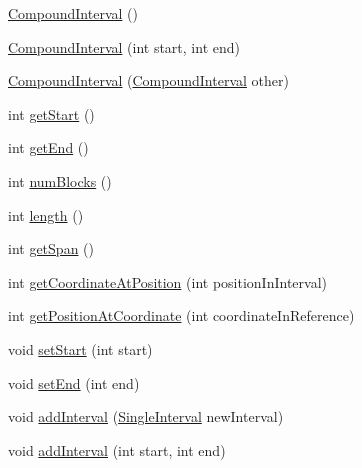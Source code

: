 \begin{DoxyCompactItemize}
\item 
\hyperlink{classumms_1_1core_1_1annotation_1_1_compound_interval_a11643c83ca967494810bdcb0bd7886a7}{Compound\+Interval} ()
\item 
\hyperlink{classumms_1_1core_1_1annotation_1_1_compound_interval_af3c436298d476702cd4f2b4f1883fe3b}{Compound\+Interval} (int start, int end)
\item 
\hyperlink{classumms_1_1core_1_1annotation_1_1_compound_interval_ad2b8402757cce5a10b4169b9103c5cbd}{Compound\+Interval} (\hyperlink{classumms_1_1core_1_1annotation_1_1_compound_interval}{Compound\+Interval} other)
\item 
int \hyperlink{classumms_1_1core_1_1annotation_1_1_compound_interval_a01a3c5e0cfce5f5a283c9ff4a7225490}{get\+Start} ()
\item 
int \hyperlink{classumms_1_1core_1_1annotation_1_1_compound_interval_acf6878737d4032c688557394d11c33ac}{get\+End} ()
\item 
int \hyperlink{classumms_1_1core_1_1annotation_1_1_compound_interval_a9783bd32eae56869c3b939d2de065269}{num\+Blocks} ()
\item 
int \hyperlink{classumms_1_1core_1_1annotation_1_1_compound_interval_adb9ece3f48e0525f8b72f12c68f847a5}{length} ()
\item 
int \hyperlink{classumms_1_1core_1_1annotation_1_1_compound_interval_a8691646ad235799c26f89c2c9d5b964e}{get\+Span} ()
\item 
int \hyperlink{classumms_1_1core_1_1annotation_1_1_compound_interval_a68a22617660bba90254228b97720b1de}{get\+Coordinate\+At\+Position} (int position\+In\+Interval)
\item 
int \hyperlink{classumms_1_1core_1_1annotation_1_1_compound_interval_a24e2ec501a12d06192e9dc77fe038cb4}{get\+Position\+At\+Coordinate} (int coordinate\+In\+Reference)
\item 
void \hyperlink{classumms_1_1core_1_1annotation_1_1_compound_interval_af7557cd3e43cbb55482a9eeea6d68629}{set\+Start} (int start)
\item 
void \hyperlink{classumms_1_1core_1_1annotation_1_1_compound_interval_a7dc57080ad2356580925c81fcf8eac43}{set\+End} (int end)
\item 
void \hyperlink{classumms_1_1core_1_1annotation_1_1_compound_interval_a037f642ffccfca2b6872b1cc0f3f8c6f}{add\+Interval} (\hyperlink{classumms_1_1core_1_1annotation_1_1_single_interval}{Single\+Interval} new\+Interval)
\item 
void \hyperlink{classumms_1_1core_1_1annotation_1_1_compound_interval_a266f3c50516fd8075eddeabd3159cea9}{add\+Interval} (int start, int end)

\end{DoxyCompactItemize}
